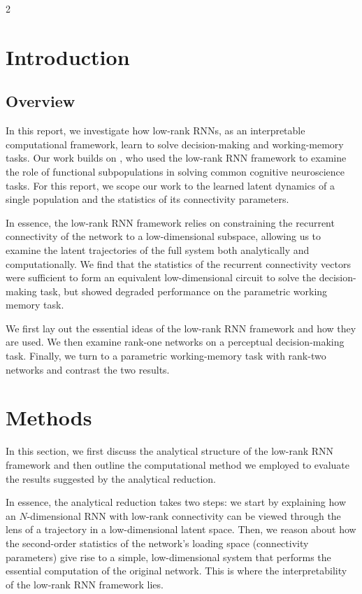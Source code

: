 \documentclass[10pt]{article}
\begin{document}
\begin{multicols}{2}

\section{Introduction}

\subsection{Overview}

In this report, we investigate how low-rank RNNs, as an interpretable computational framework, learn to solve decision-making and working-memory tasks. Our work builds on \citet{dubreuil2022}, who used the low-rank RNN framework to examine the role of functional subpopulations in solving common cognitive neuroscience tasks. For this report, we scope our work to the learned latent dynamics of a single population and the statistics of its connectivity parameters.

In essence, the low-rank RNN framework relies on constraining the recurrent connectivity of the network to a low-dimensional subspace, allowing us to examine the latent trajectories of the full system both analytically and computationally. We find that the statistics of the recurrent connectivity vectors were sufficient to form an equivalent low-dimensional circuit to solve the decision-making task, but showed degraded performance on the parametric working memory task.

We first lay out the essential ideas of the low-rank RNN framework and how they are used. We then examine rank-one networks on a perceptual decision-making task. Finally, we turn to a parametric working-memory task with rank-two networks and contrast the two results.

\section{Methods}

In this section, we first discuss the analytical structure of the low-rank RNN framework and then outline the computational method we employed to evaluate the results suggested by the analytical reduction.

In essence, the analytical reduction takes two steps: we start by explaining how an $N$-dimensional RNN with low-rank connectivity can be viewed through the lens of a trajectory in a low-dimensional latent space. Then, we reason about how the second-order statistics of the network's loading space (connectivity parameters) give rise to a simple, low-dimensional system that performs the essential computation of the original network. This is where the interpretability of the low-rank RNN framework lies.


\end{multicols}
\end{document}
